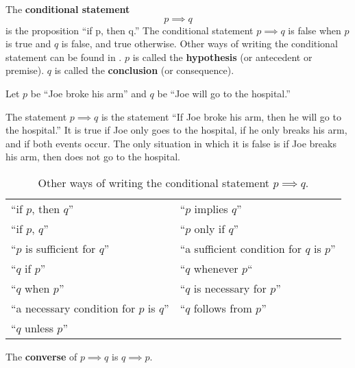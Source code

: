   The \textbf{conditional statement} \[p \implies q\] is the proposition ``if p, then q.''
  The conditional statement \(p \implies q\) is false when \(p\) is true and \(q\) is false, and true otherwise.
  Other ways of writing the conditional statement can be found in .
  \(p\) is called the \textbf{hypothesis} (or antecedent or premise).
  \(q\) is called the \textbf{conclusion} (or consequence).
  \begin{ex}
    Let $p$ be ``Joe broke his arm'' and $q$ be ``Joe will go to the hospital.''

    The statement $p \implies q$ is the statement ``If Joe broke his arm, then he will go to the hospital.''
    It is true if Joe only goes to the hospital, if he only breaks his arm, and if both events occur.
    The only situation in which it is false is if Joe breaks his arm, then does not go to the hospital.
  \end{ex}
  \begin{table}[H]
  \centering
    \begin{tabular}{p{2in} p{2in}}
      ``if \(p\), then \(q\)'' & ``\(p\) implies \(q\)'' \\
      ``if \(p\), \(q\)'' & ``\(p\) only if \(q\)'' \\
      ``\(p\) is sufficient for \(q\)'' & ``a sufficient condition for \(q\) is \(p\)'' \\
      ``\(q\) if \(p\)'' & ``\(q\) whenever \(p\)`` \\
      ``\(q\) when \(p\)'' & ``\(q\) is necessary for \(p\)'' \\
      ``a necessary condition for \(p\) is \(q\)'' & ``\(q\) follows from \(p\)'' \\
      ``\(q\) unless \(p\)''
    \end{tabular}
  \caption{Other ways of writing the conditional statement \(p \implies q\).}
  \label{tab:conditionals}
\end{table}
  The \textbf{converse} of \(p \implies q\) is \(q \implies p\).

